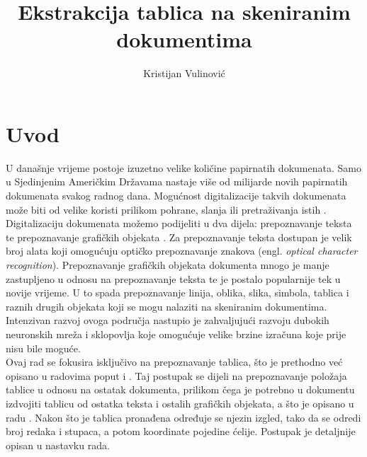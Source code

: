 \documentclass[times, utf8, zavrsni, numeric]{fer}
\begin{document}
\title{Ekstrakcija tablica na skeniranim dokumentima}
\author{Kristijan Vulinović}

\maketitle




\tableofcontents

\chapter{Uvod   }
U današnje vrijeme postoje izuzetno velike količine papirnatih dokumenata.
Samo u Sjedinjenim Američkim Državama nastaje više od milijarde novih papirnatih dokumenata svakog radnog dana. 
Mogućnost digitalizacije takvih dokumenata može biti od velike koristi prilikom pohrane, slanja ili pretraživanja istih \cite{article:Skew-detection}.
Digitalizaciju dokumenata možemo podijeliti u dva dijela: prepoznavanje teksta te prepoznavanje grafičkih objekata \cite{conference:DetectionOfTableStructure}. 
Za prepoznavanje teksta dostupan je velik broj alata koji omogućuju optičko prepoznavanje znakova (engl. \textit{optical character recognition}).
Prepoznavanje grafičkih objekata dokumenta mnogo je manje zastupljeno u odnosu na prepoznavanje teksta te je postalo popularnije tek u novije vrijeme. 
U to spada prepoznavanje linija, oblika, slika, simbola, tablica i raznih drugih objekata koji se mogu nalaziti na skeniranim dokumentima.
Intenzivan razvoj ovoga područja nastupio je zahvaljujući razvoju dubokih neuronskih mreža i sklopovlja koje omogućuje velike brzine izračuna koje prije nisu bile moguće.\\

Ovaj rad se fokusira isključivo na prepoznavanje tablica, što je prethodno već opisano u radovima poput \cite{conference:DetectionOfTableStructure} i \cite{conference:AutomaticTableDetectionInDocumentImages}. 
Taj postupak se dijeli na prepoznavanje položaja tablice u odnosu na ostatak dokumenta, prilikom čega je potrebno u dokumentu izdvojiti tablicu od ostatka teksta i ostalih grafičkih objekata, a što je opisano u radu \cite{article:Medium-IndependentTableDetection}.
Nakon što je tablica pronađena određuje se njezin izgled, tako da se odredi broj redaka i stupaca, a potom koordinate pojedine ćelije.
Postupak je detaljnije opisan u nastavku rada. \\
\end{document}
